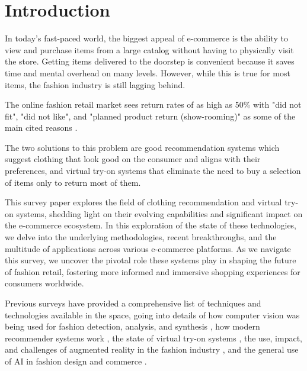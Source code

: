 \section{\textbf{Introduction}} \label{section:intro}
	In today's fast-paced world, the biggest appeal of e-commerce is the ability to view and purchase items from a large catalog without having to physically visit the store. Getting items delivered to the doorstep is convenient because it saves time and mental overhead on many levels. However, while this is true for most items, the fashion industry is still lagging behind.

	The online fashion retail market sees return rates of as high as 50\% with "did not fit", "did not like", and "planned product return (show-rooming)" as some of the main cited reasons \cite{stocker2021new}.

	The two solutions to this problem are good recommendation systems which suggest clothing that look good on the consumer and aligns with their preferences, and virtual try-on systems that eliminate the need to buy a selection of items only to return most of them.

	This survey paper explores the field of clothing recommendation and virtual try-on systems, shedding light on their evolving capabilities and significant impact on the e-commerce ecosystem. In this exploration of the state of these technologies, we delve into the underlying methodologies, recent breakthroughs, and the multitude of applications across various e-commerce platforms. As we navigate this survey, we uncover the pivotal role these systems play in shaping the future of fashion retail, fostering more informed and immersive shopping experiences for consumers worldwide.

	Previous surveys have provided a comprehensive list of techniques and technologies available in the space, going into details of how computer vision was being used for fashion detection, analysis, and synthesis \cite{DBLP:journals/csur/ChengSCHL21, Jain_Wah_2022}, how modern recommender systems work \cite{DBLP:journals/corr/abs-2202-02757, DBLP:journals/sncs/ShirkhaniMSH23}, the state of virtual try-on systems \cite{DBLP:journals/corr/abs-2111-00905, DBLP:journals/mta/GhodhbaniNRA22, DBLP:journals/cvm/LiangL21}, the use, impact, and challenges of augmented reality in the fashion industry \cite{menon2020impact, jayamini2021use, DBLP:journals/corr/abs-2202-09450, huang2019enhancing, mehta2020enhancement, zak2020augmented, caboni2019augmented}, and the general use of AI in fashion design and commerce \cite{DBLP:journals/access/GiriJZB19, DBLP:journals/corr/abs-2105-03050, DBLP:journals/access/GuoZLCCW23, DBLP:journals/spm/ChenSC23, sahni2021review, liang2020implementation, sareen2022ai, 10153335, DBLP:journals/tmm/Yan0LZX0Y23}.

